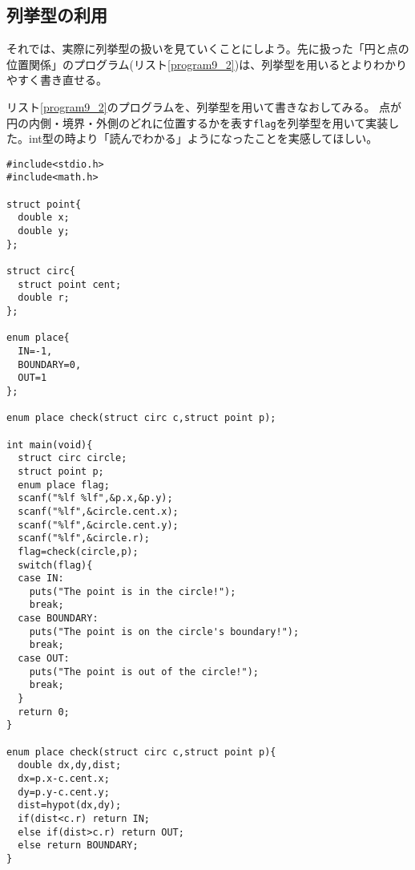 \subsection{列挙型の利用}
それでは、実際に列挙型の扱いを見ていくことにしよう。先に扱った「円と点の位置関係」のプログラム(リスト\ref{program9_2})は、列挙型を用いるとよりわかりやすく書き直せる。
\begin{boxnote}
リスト\ref{program9_2}のプログラムを、列挙型を用いて書きなおしてみる。
点が円の内側・境界・外側のどれに位置するかを表す\verb|flag|を列挙型を用いて実装した。int型の時より「読んでわかる」ようになったことを実感してほしい。
\end{boxnote}
\begin{boxnote}
\begin{multicols}{2}
\begin{lstlisting}[caption=円と点の位置関係(列挙型版),label=program9_5]
#include<stdio.h>
#include<math.h>

struct point{
  double x;
  double y;
};

struct circ{
  struct point cent;
  double r;
};

enum place{
  IN=-1,
  BOUNDARY=0,
  OUT=1
};

enum place check(struct circ c,struct point p);

int main(void){
  struct circ circle;
  struct point p;
  enum place flag;
  scanf("%lf %lf",&p.x,&p.y);
  scanf("%lf",&circle.cent.x);
  scanf("%lf",&circle.cent.y);
  scanf("%lf",&circle.r);
  flag=check(circle,p);
  switch(flag){
  case IN:
    puts("The point is in the circle!");
    break;
  case BOUNDARY:
    puts("The point is on the circle's boundary!");
    break;
  case OUT:
    puts("The point is out of the circle!");
    break;
  }
  return 0; 
}

enum place check(struct circ c,struct point p){
  double dx,dy,dist;
  dx=p.x-c.cent.x;
  dy=p.y-c.cent.y;
  dist=hypot(dx,dy);
  if(dist<c.r) return IN;
  else if(dist>c.r) return OUT;
  else return BOUNDARY;
}
\end{lstlisting}
\end{multicols}
\end{boxnote}

